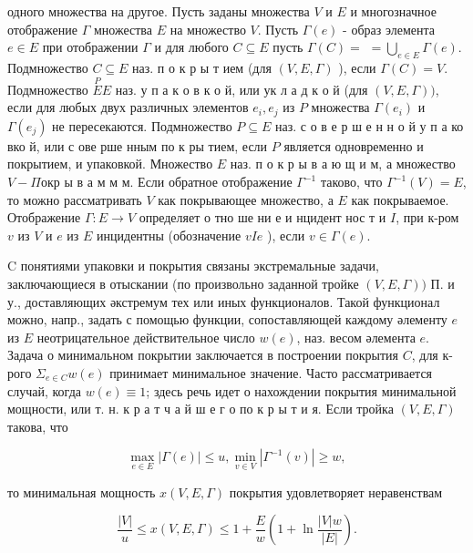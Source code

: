 \documentclass[10pt]{article}
\begin{document}
одного множества на другое. Пусть заданы множества $V$ и $E$ и многозначное отображение $\Gamma$ множества $E$ на множество $V$. Пусть $\Gamma(e)$ - образ элемента $e \in E$ при отображении $\Gamma$ и для любого $C \subseteq E$ пусть $\Gamma(C)=$ $=\bigcup_{e \in E} \Gamma(e)$. Подмножество $C \subseteq E$ наз. п о к р ы т ием (для $(V, E, \Gamma)$ ), если $\Gamma(C)=V$. Подмножество $\stackrel{P}{E} E$ наз. у п а к о в к о й, или ук л а д к о й (для $(V, E, \Gamma))$, если для любых двух различных элементов $e_{i}, e_{j}$ из $P$ множества $\Gamma\left(e_{i}\right)$ и $\Gamma\left(e_{j}\right)$ не пересекаются. Подмножество $P \subseteq E$ наз. с о в е р ш е н н о й у п а ко вко й, или с ове рше нным по к ры тием, если $P$ является одновременно и покрытием, и упаковкой. Множество $E$ наз. п о к р ы в а ю щ и м, а множество $V-\Pi о к р$ ы в а м м м. Если обратное отображение $\Gamma^{-1}$ таково, что $\Gamma^{-1}(V)=E$, то можно рассматривать $V$ как покрывающее множество, а $E$ как покрываемое. Отображение $\Gamma: E \rightarrow V$ определяет о тно ше ни е и нцидент нос т и $I$, при к-ром $v$ из $V$ и $e$ из $E$ инцидентны (обозначение $v I e$ ), если $v \in \Gamma(e)$.



C понятиями упаковки и покрытия связаны экстремальные задачи, заключающиеся в отыскании (по произвольно заданной тройке $(V, E, \Gamma))$ П. и у., доставляющих әкстремум тех или иных функционалов. Такой функционал можно, напр., задать с помощью функции, сопоставляющей каждому әлементу $e$ из $E$ неотрицательное действительное число $w(e)$, наз. весом әлемента $e$. Задача о минимальном покрытии заключается в построении покрытия $C$, для к-рого $\Sigma_{e \in C} w(e)$ принимает минимальное значение. Часто рассматривается случай, когда $w(e) \equiv 1$; здесь речь идет о нахождении покрытия минимальной мощности, или т. н. к р а т ч а й ш е г о по к р ы т и я. Если тройка $(V, E, \Gamma)$ такова, что



\[

\max _{e \in E}|\Gamma(e)| \leqslant u, \min _{v \in V}\left|\Gamma^{-1}(v)\right| \geqslant w,

\]



то минимальная мощность $x(V, E, \Gamma)$ покрытия удовлетворяет неравенствам



\[

\frac{|V|}{u} \leqslant x(V, E, \Gamma) \leqslant 1+\frac{E}{w}\left(1+\ln \frac{|V| w}{|E|}\right) .

\]
\end{document}
